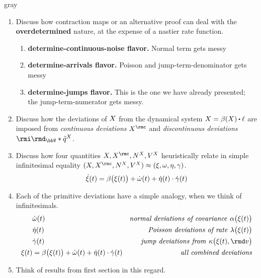 \begin{color}{gray}
  \begin{enumerate}
    \item
      Discuss how contraction maps or an alternative proof can deal with the \textbf{overdetermined} nature, at the expense of a nastier rate function.
      \begin{enumerate}
        \item
          \textbf{determine-continuous-noise flavor.}
          Normal term gets messy
        \item
          \textbf{determine-arrivals flavor.}
          Poisson and jump-term-denominator gets messy
        \item
          \textbf{determine-jumps flavor.}
          This is the one we have already presented; the jump-term-numerator gets messy.
      \end{enumerate}
    \item
      Discuss how the deviations of $X$ from the dynamical system $\X = \affDrift(\X) \shortInt \leb$ are imposed from \emph{continuous deviations} $\X^\rmc$ and \emph{discontinuous deviations} $\id_\vecSpace \ast \compensate{\jumpMeas^\X}$.
    \item
      Discuss how four quantities $\X, \X^\rmc, \N^\X, V^\X$ heuristically relate in simple infinitesimal equality $(\X, \X^\rmc, \N^\X, V^\X) \approx (\pathVar, \omega, \eta, \gamma)$.
      \begin{align*}
        \dot{\xi}(t) = \beta\big(\xi(t)\big) + \dot\omega(t) + \dot\eta(t) \cdot \dot\gamma(t)
      \end{align*}
    \item
      Each of the primitive deviations have a simple analogy, when we think of infinitesimals.
      \begin{align*}
        &\dot\omega(t)  & \text{\emph{normal deviations of covariance }} \affDiff\big(\pathVar(t)\big) \\
        &\dot\eta(t) & \text{\emph{Poisson deviations of rate }} \affInt\big(\pathVar(t)\big) \\
        &\dot\gamma(t) & \text{\emph{jump deviations from }} \affDist\big(\pathVar(t), \rmd\markVar\big) \\
        \pathVar(t) &=\affDrift\big(\pathVar(t)\big) + \dot\omega(t) + \dot\eta(t)\cdot\dot\gamma(t) & \text{\emph{all combined deviations}}
      \end{align*}
    \item
      Think of results from first section in this regard.

\end{enumerate}
\end{color}
